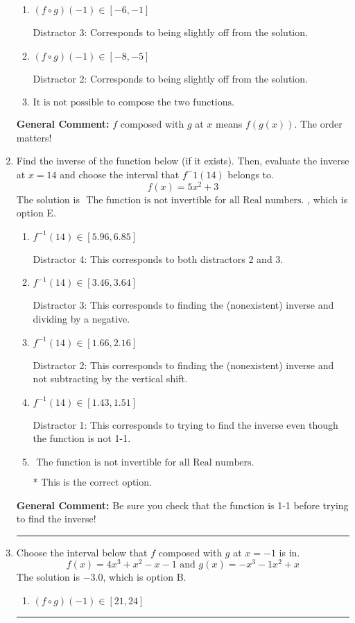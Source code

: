 \documentclass{extbook}[14pt]
\newcommand{\litem}[1]{\item #1

\rule{\textwidth}{0.4pt}}
\begin{document}
\begin{enumerate}
{\begin{enumerate}[label=\Alph*.]
 Distractor 1: Corresponds to reversing the composition.
\item \( (f \circ g)(-1) \in [-6, -1] \)

 Distractor 3: Corresponds to being slightly off from the solution.
\item \( (f \circ g)(-1) \in [-8, -5] \)

 Distractor 2: Corresponds to being slightly off from the solution.
\item \( \text{It is not possible to compose the two functions.} \)


\end{enumerate}

\textbf{General Comment:} $f$ composed with $g$ at $x$ means $f(g(x))$. The order matters!
}
\litem{
Find the inverse of the function below (if it exists). Then, evaluate the inverse at $x = 14$ and choose the interval that $f^-1(14)$ belongs to.
\[ f(x) = 5 x^2 + 3 \]The solution is \( \text{ The function is not invertible for all Real numbers. } \), which is option E.\begin{enumerate}[label=\Alph*.]
\item \( f^{-1}(14) \in [5.96, 6.85] \)

 Distractor 4: This corresponds to both distractors 2 and 3.
\item \( f^{-1}(14) \in [3.46, 3.64] \)

 Distractor 3: This corresponds to finding the (nonexistent) inverse and dividing by a negative.
\item \( f^{-1}(14) \in [1.66, 2.16] \)

 Distractor 2: This corresponds to finding the (nonexistent) inverse and not subtracting by the vertical shift.
\item \( f^{-1}(14) \in [1.43, 1.51] \)

 Distractor 1: This corresponds to trying to find the inverse even though the function is not 1-1. 
\item \( \text{ The function is not invertible for all Real numbers. } \)

* This is the correct option.
\end{enumerate}

\textbf{General Comment:} Be sure you check that the function is 1-1 before trying to find the inverse!
}
\litem{
Choose the interval below that $f$ composed with $g$ at $x=-1$ is in.
\[ f(x) = 4x^{3} + x^{2} -x -1 \text{ and } g(x) = -x^{3} -1 x^{2} +x \]The solution is \( -3.0 \), which is option B.\begin{enumerate}[label=\Alph*.]
\item \( (f \circ g)(-1) \in [21, 24] \)


\end{enumerate}}
\end{enumerate}
\end{document}
